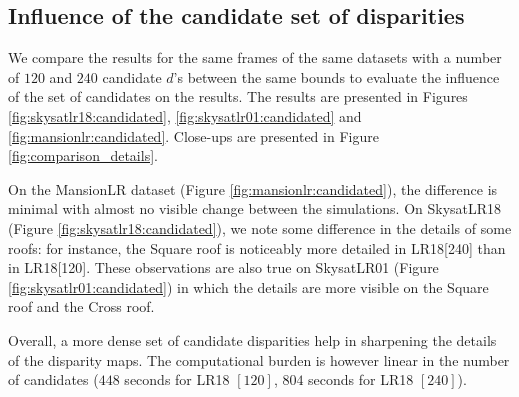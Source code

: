\documentclass{article}
\theoremstyle{definition}
\begin{document}
\subsection{Influence of the candidate set of disparities}


We compare the results for the same frames of the same datasets with a number of $120$ and $240$ candidate $d$'s between the same bounds to evaluate the influence of the set of candidates on the results. The results are presented in Figures \ref{fig:skysatlr18:candidated}, \ref{fig:skysatlr01:candidated} and \ref{fig:mansionlr:candidated}. Close-ups are presented in Figure \ref{fig:comparison_details}.


On the MansionLR dataset (Figure \ref{fig:mansionlr:candidated}), the difference is minimal with almost no visible change between the simulations. On SkysatLR18 (Figure \ref{fig:skysatlr18:candidated}), we note some difference in the details of some roofs: for instance, the Square roof is noticeably more detailed in LR18[240] than in LR18[120]. These observations are also true on SkysatLR01 (Figure \ref{fig:skysatlr01:candidated}) in which the details are more visible on the Square roof and the Cross roof.


Overall, a more dense set of candidate disparities help in sharpening the details of the disparity maps. The computational burden is however linear in the number of candidates ($448$ seconds for LR18 $[120]$, $804$ seconds for LR18 $[240]$).
\end{document}

